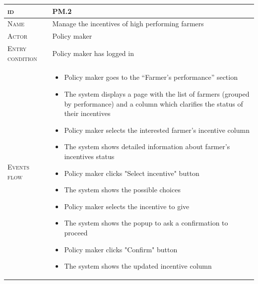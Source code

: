 \begin{table}[H]
    \centering
    \begin{tabular}{|l|p{}|}
        \hline %
    	\textsc{id}                 &   PM.2\\
    	\hline %
    	\textsc{Name}               &   Manage the incentives of high performing farmers \\
    	\hline %
    	\textsc{Actor}             &   Policy maker\\
    	\hline %
    	\textsc{Entry condition}   &   Policy maker has logged in\\
    	\hline %
    	\textsc{Events flow}         &   %
            	                        \begin{itemize}
                                    	    \item Policy maker goes to the “Farmer’s performance” section
                                    		\item The system displays a page with the list of farmers (grouped by performance) and a column which clarifies the status of their incentives 
                                       		\item Policy maker selects the interested farmer’s incentive column
                                    		\item The system shows detailed information about farmer’s incentives status
                                    		\item Policy maker clicks "Select incentive" button
                                    		\item The system shows the possible choices
                                    		\item Policy maker selects the incentive to give
                                    		\item The system shows the popup to ask a confirmation to proceed
                                    		\item Policy maker clicks "Confirm" button
                                    		\item The system shows the updated incentive column
                                        \end{itemize}\\

\end{tabular}
\end{table}
